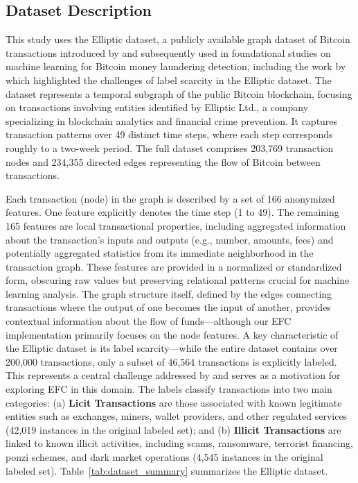 \documentclass[12pt]{article}
\begin{document}
\subsection{Dataset Description} \label{subsec:dataset}
This study uses the Elliptic dataset, a publicly available graph dataset of Bitcoin transactions introduced by 
\cite{weber2019antimoneylaunderingbitcoinexperimenting} and subsequently used in foundational studies on machine
learning for Bitcoin money laundering detection, including the work by~\cite{lorenz2021machinelearningmethodsdetect}
which highlighted the challenges of label scarcity in the Elliptic dataset. The dataset represents a temporal subgraph of
the public Bitcoin blockchain, focusing on transactions involving entities identified by Elliptic Ltd., a company specializing
in blockchain analytics and financial crime prevention. It captures transaction patterns over 49 distinct time steps, where
each step corresponds roughly to a two-week period. The full dataset comprises 203,769 transaction nodes and 234,355 directed edges
representing the flow of Bitcoin between transactions.

Each transaction (node) in the graph is described by a set of 166 anonymized features. One feature explicitly denotes the
time step (1 to 49). The remaining 165 features are local transactional properties, including aggregated information about
the transaction's inputs and outputs (e.g., number, amounts, fees) and potentially aggregated statistics from its immediate
neighborhood in the transaction graph. These features are provided in a normalized or standardized form, obscuring raw
values but preserving relational patterns crucial for machine learning analysis. The graph structure itself, defined by
the edges connecting transactions where the output of one becomes the input of another, provides contextual information
about the flow of funds---although our EFC implementation primarily focuses on the node features. A key characteristic of
the Elliptic dataset is its label scarcity---while the entire dataset contains over 200,000 transactions, only a subset of
46,564 transactions is explicitly labeled. This represents a central challenge addressed by \cite{lorenz2021machinelearningmethodsdetect}
and serves as a motivation for exploring EFC in this domain.  
The labels classify transactions into two main categories: (a) {\bf Licit Transactions} are those associated with known
legitimate entities such as exchanges, miners, wallet providers, and other regulated services (42,019 instances in the
original labeled set); and (b) {\bf Illicit Transactions} are linked to known illicit activities, including scams, ransomware,
terrorist financing, ponzi schemes, and dark market operations (4,545 instances in the original labeled set). Table~\ref{tab:dataset_summary}
summarizes the Elliptic dataset.
\end{document}
